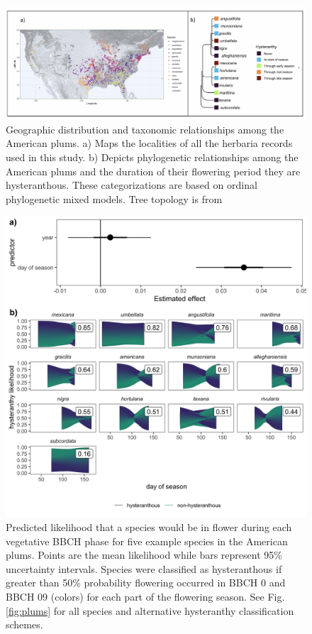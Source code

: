 \documentclass{article}[12pt]
\begin{document}
\begin{figure}[h!]
  \centering
 \includegraphics[width=\textwidth]{..//..//Plots/fig1_new.jpg}
    \caption{Geographic distribution and taxonomic relationships among the American plums. a) Maps the localities of all the herbaria records used in this study. b) Depicts phylogenetic relationships among the American plums and the duration of their flowering period they are hysteranthous. These categorizations are based on ordinal phylogenetic mixed models. Tree topology is from \citet{Shaw:2004aa}}
    \label{fig:phylo2}
\end{figure}



\begin{figure}[h!]
    \centering
 \includegraphics[width=\textwidth]{..//..//Plots/whatReviwerswant/sps_preds.jpeg}
    \caption{Predicted likelihood that a species would be in flower during each vegetative BBCH phase for five example species in the American plums. Points are the mean likelihood while bars represent 95\% uncertainty intervals. Species were classified as hysteranthous if greater than 50\% probability flowering occurred in BBCH 0 and BBCH 09 (colors) for each part of the flowering season.
  See Fig. \ref{fig:plums} for all species and alternative hysteranthy classification schemes. }
    \label{fig:ordinals}
\end{figure}
\end{document}
